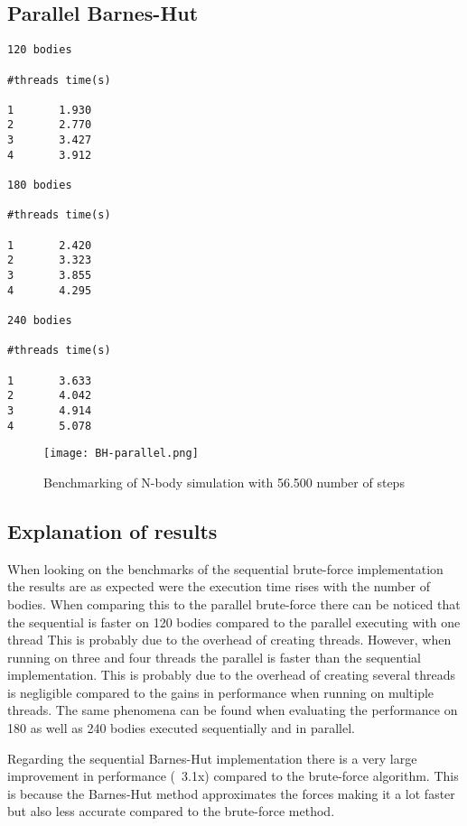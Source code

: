 \documentclass{article}
\begin{document}
\subsection{Parallel Barnes-Hut}
\begin{verbatim}
120 bodies

#threads time(s)

1       1.930
2       2.770
3       3.427
4       3.912

180 bodies

#threads time(s)

1       2.420
2       3.323
3       3.855
4       4.295

240 bodies

#threads time(s)

1       3.633
2       4.042
3       4.914
4       5.078
\end{verbatim}
\begin{figure}[h]
\centering
\texttt{[image: BH-parallel.png]}
\caption{Benchmarking of N-body simulation with 56.500 number of steps}
\end{figure}

\subsection{Explanation of results}
When looking on the benchmarks of the sequential brute-force implementation the results are as expected were the execution time rises with the number of bodies. When comparing this to the parallel brute-force there can be noticed that the sequential is faster on 120 bodies compared to the parallel executing with one thread This is probably due to the overhead of creating threads. However, when running on three and four threads the parallel is faster than the sequential implementation. This is probably due to the overhead of creating several threads is negligible compared to the gains in performance when running on multiple threads. The same phenomena can be found when evaluating the performance on 180 as well as 240 bodies executed sequentially and in parallel. 

Regarding the sequential Barnes-Hut implementation there is a very large improvement in performance (~3.1x) compared to the brute-force algorithm. This is because the Barnes-Hut method approximates the forces making it a lot faster but also less accurate compared to the brute-force method.   
\end{document}
